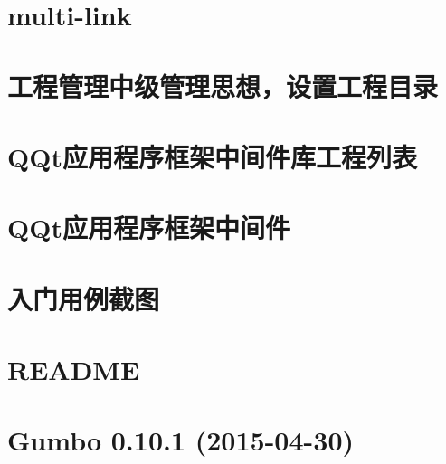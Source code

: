\documentclass[twoside]{book}
\newcommand{\+}{\discretionary{\mbox{\scriptsize$\hookleftarrow$}}{}{}}
\begin{document}
\chapter{multi-\/link}
\label{md__r_1__develop_a0-develop__lib_q_qt_multi-link}

\chapter{工程管理中级管理思想，设置工程目录}
\label{md__r_1__develop_a0-develop__lib_q_qt_project-manager}

\chapter{Q\+Qt应用程序框架中间件库工程列表}
\label{md__r_1__develop_a0-develop__lib_q_qt_project}

\chapter{Q\+Qt应用程序框架中间件}
\label{md__r_1__develop_a0-develop__lib_q_qt__r_e_a_d_m_e}

\chapter{入门用例截图}
\label{md__r_1__develop_a0-develop__lib_q_qt_screenshot}

\chapter{R\+E\+A\+D\+ME}
\label{md__r_1__develop_a0-develop__lib_q_qt_src_exquisite_qrcode_qrdecode__r_e_a_d_m_e}

\chapter{Gumbo 0.10.1 (2015-\/04-\/30)}
\label{md__r_1__develop_a0-develop__lib_q_qt_src_network_gumbo_parser__c_h_a_n_g_e_s}

\end{document}
